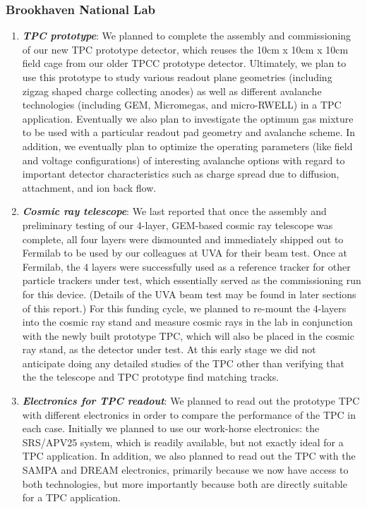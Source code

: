 \subsubsection{Brookhaven National Lab}

\begin{enumerate}

\item	\textbf{\emph{TPC prototype}}: We planned to complete the assembly and commissioning of our new TPC prototype detector, which reuses the 10cm x 10cm x 10cm field cage from our older TPCC prototype detector. Ultimately, we plan to use this prototype to study various readout plane geometries (including zigzag shaped charge collecting anodes) as well as different avalanche technologies (including GEM, Micromegas, and micro-RWELL) in a TPC application. Eventually we also plan to investigate the optimum gas mixture to be used with a particular readout pad geometry and avalanche scheme. In addition, we eventually plan to optimize the operating parameters (like field and voltage configurations) of interesting avalanche options with regard to important detector characteristics such as charge spread due to diffusion, attachment, and ion back flow.   

\item \textbf{\emph{Cosmic ray telescope}}: We last reported that once the assembly and preliminary testing of our 4-layer, GEM-based cosmic ray telescope was complete, all four layers were dismounted and immediately shipped out to Fermilab to be used by our colleagues at UVA for their beam test. Once at Fermilab, the 4 layers were successfully used as a reference tracker for other particle trackers under test, which essentially served as the commissioning run for this device. (Details of the UVA beam test may be found in later sections of this report.) For this funding cycle, we planned to re-mount the 4-layers into the cosmic ray stand and measure cosmic rays in the lab in conjunction with the newly built prototype TPC, which will also be placed in the cosmic ray stand, as the detector under test. At this early stage we did not anticipate doing any detailed studies of the TPC other than verifying that the the telescope and TPC prototype find matching tracks. 

\item	\textbf{\emph{Electronics for TPC readout}}: We planned to read out the prototype TPC with different electronics in order to compare the performance of the TPC in each case. Initially we planned to use our work-horse electronics: the SRS/APV25 system, which is readily available, but not exactly ideal for a TPC application. In addition, we also planned to read out the TPC with the SAMPA and DREAM electronics, primarily because we now have access to both technologies, but more importantly because both are directly suitable for a TPC application.  


\end{enumerate}
